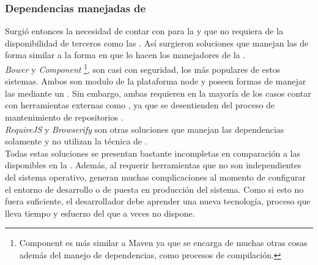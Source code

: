\subsubsection{Dependencias manejadas de \viewtier}
\label{susubbsec:intro:jvm_dev:view_managed}

Surgió entonces la necesidad de contar con \depmgrs para
la \viewtier y que no requiera de la disponibilidad de terceros como las \cdns.
Así surgieron soluciones que manejan las \dependencies de forma similar a la
forma en que lo hacen los manejadores de la \logictier.\\
\emph{Bower} y \emph{Component} \footnote{
	Component es más similar a Maven ya que se encarga de muchas
	otras cosas además del manejo de dependencias, como procesos de compilación.
}, son casi con seguridad, los más populares de estos sistemas. Ambos son modulo de
la plataforma \gls{node} y poseen formas de manejar las \dependencies mediante un
\conffile. Sin embargo, ambas requieren en la mayoría de los casos
contar con herramientas externas como \git, ya que se desentienden del proceso de
mantenimiento de repositorios \cite{Bower:ONLINE}.\\
\emph{RequireJS} y \emph{Browserify} son otras soluciones que manejan las dependencias
\js solamente y no utilizan la técnica de \conffiles
{}.\\
Todas estas soluciones se presentan bastante incompletas en comparación a las
disponibles en la \viewtier. Además, al requerir herramientas que no son
independientes del sistema operativo, generan muchas complicaciones al momento
de configurar el entorno de desarrollo o de puesta en producción del sistema.
Como si esto no fuera suficiente, el desarrollador debe aprender una nueva
tecnología, proceso que lleva tiempo y esfuerzo del que a veces no dispone.